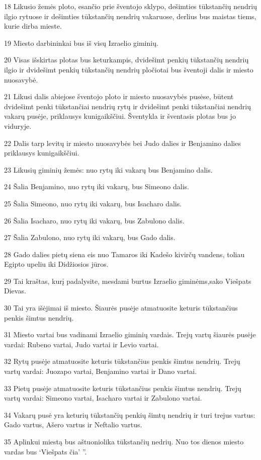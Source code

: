 \par 18 Likusio žemės ploto, esančio prie šventojo sklypo, dešimties tūkstančių nendrių ilgio rytuose ir dešimties tūkstančių nendrių vakaruose, derlius bus maistas tiems, kurie dirba mieste. 
\par 19 Miesto darbininkai bus iš visų Izraelio giminių. 
\par 20 Visas išskirtas plotas bus keturkampis, dvidešimt penkių tūkstančių nendrių ilgio ir dvidešimt penkių tūkstančių nendrių pločio­tai bus šventoji dalis ir miesto nuosavybė. 
\par 21 Likusi dalis abiejose šventojo ploto ir miesto nuosavybės pusėse, būtent dvidešimt penki tūkstančiai nendrių rytų ir dvidešimt penki tūkstančiai nendrių vakarų pusėje, priklausys kunigaikščiui. Šventykla ir šventasis plotas bus jo viduryje. 
\par 22 Dalis tarp levitų ir miesto nuosavybės bei Judo dalies ir Benjamino dalies priklausys kunigaikščiui. 
\par 23 Likusių giminių žemės: nuo rytų iki vakarų bus Benjamino dalis. 
\par 24 Šalia Benjamino, nuo rytų iki vakarų, bus Simeono dalis. 
\par 25 Šalia Simeono, nuo rytų iki vakarų, bus Isacharo dalis. 
\par 26 Šalia Isacharo, nuo rytų iki vakarų, bus Zabulono dalis. 
\par 27 Šalia Zabulono, nuo rytų iki vakarų, bus Gado dalis. 
\par 28 Gado dalies pietų siena eis nuo Tamaros iki Kadešo kivirčų vandens, toliau Egipto upeliu iki Didžiosios jūros. 
\par 29 Tai kraštas, kurį padalysite, mesdami burtus Izraelio giminėms,­sako Viešpats Dievas.­ 
\par 30 Tai yra išėjimai iš miesto. Šiaurės pusėje atmatuosite keturis tūkstančius penkis šimtus nendrių. 
\par 31 Miesto vartai bus vadinami Izraelio giminių vardais. Trejų vartų šiaurės pusėje vardai: Rubeno vartai, Judo vartai ir Levio vartai. 
\par 32 Rytų pusėje atmatuosite keturis tūkstančius penkis šimtus nendrių. Trejų vartų vardai: Juozapo vartai, Benjamino vartai ir Dano vartai. 
\par 33 Pietų pusėje atmatuosite keturis tūkstančius penkis šimtus nendrių. Trejų vartų vardai: Simeono vartai, Isacharo vartai ir Zabulono vartai. 
\par 34 Vakarų pusė yra keturių tūkstančių penkių šimtų nendrių ir turi trejus vartus: Gado vartus, Ašero vartus ir Neftalio vartus. 
\par 35 Aplinkui miestą bus aštuoniolika tūkstančių nedrių. Nuo tos dienos miesto vardas bus ‘Viešpats čia’ ”.



